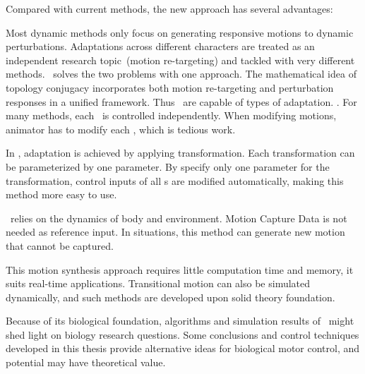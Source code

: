 Compared with current \cms methods, the new approach has several advantages:
\begin{enumerate}
Most dynamic methods only focus on generating responsive motions to dynamic perturbations.
Adaptations across different characters are treated as an independent research topic~(motion re-targeting) and tackled with very different methods.
{\moit}\ solves the two problems with one approach.
The mathematical idea of topology conjugacy  incorporates both motion re-targeting and  perturbation responses  in a unified framework.
Thus {\moit}\ are capable of types of adaptation.
.
For many \cms methods, each \dof ~is controlled independently.
When modifying motions, animator has to modify each \dof, which is tedious work.

In {\moit}, adaptation is achieved by applying transformation.
Each transformation can be parameterized by one parameter. 
By specify only one parameter for the transformation, control inputs of all {\dof}s are modified automatically, making this method more easy to use.

{\moit}\ relies on the dynamics of body and environment.
Motion Capture Data is not needed as reference input.
In situations, this method can generate new motion that cannot be captured.


This motion synthesis approach requires little computation time and memory, it suits real-time applications.
Transitional motion can also be simulated dynamically, and such methods are developed upon solid theory foundation.

\end{enumerate}

Because of its biological foundation,
algorithms and simulation results of {\moit}\  might shed light on biology research questions.
Some conclusions and control techniques developed in this thesis provide alternative ideas for biological motor control, and potential may have theoretical value.

